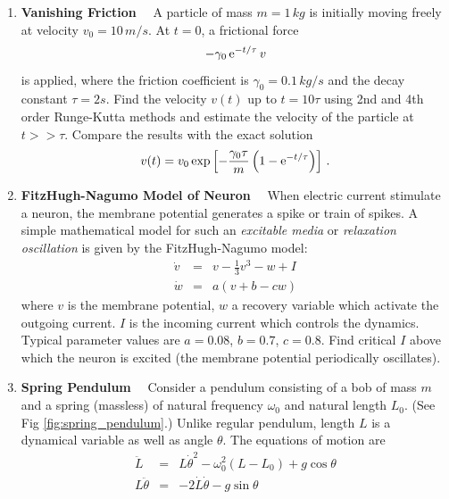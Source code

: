 \begin{enumerate}[labelwidth=0.5cm,labelindent=0cm,leftmargin=*,label=\bfseries \thechapter.\arabic*,align=left]
\item \textbf{Vanishing Friction}~~
A particle of mass $m=1\, kg$ is initially moving freely at velocity $v_0=10\, m/s$.  At $t=0$, a frictional force
\begin{equation}
-\gamma_0\, \text{e}^{-t/\tau}\, v
\end{equation}
is applied, where the friction coefficient is $\gamma_0=0.1\, kg/s$ and the decay constant $\tau = 2s$. Find the velocity $v(t)$ up to $t=10\tau$ using 2nd and 4th order Runge-Kutta methods and estimate the velocity of the particle at $t>>\tau$. Compare the results with the exact solution 
\begin{equation}
v(t) = v_0 \exp \left [ - \frac{\gamma_0 \tau}{m} \left (1-\text{e}^{-t/\tau} \right ) \right ]\, .
\end{equation}


\item  \textbf{FitzHugh-Nagumo Model of Neuron}~~
When electric current stimulate a neuron, the membrane potential generates a spike or train of spikes. A simple mathematical model for such an \emph{excitable media} or \emph{relaxation oscillation} is given by the FitzHugh-Nagumo model\cite{FitzHugh-Nagumo}:
\begin{subequations}
\begin{eqnarray}
\dot{v} &=& v - \frac{1}{3}v^3 - w + I \\
\dot{w} &=& a (v + b - c w)
\end{eqnarray}
\end{subequations}
where $v$ is the membrane potential, $w$ a recovery variable which activate the outgoing current. $I$ is the incoming current which controls the dynamics. Typical parameter values are $a=0.08$, $b=0.7$, $c=0.8$.  Find critical $I$ above which the neuron is excited (the membrane potential periodically oscillates).

\item \textbf{Spring Pendulum}~~
Consider a pendulum consisting of a bob of mass $m$ and a spring (massless) of natural frequency $\omega_0$ and natural length $L_0$.\cite{spring_pendulum}
(See Fig \ref{fig:spring_pendulum}.)  Unlike regular pendulum, length $L$ is a dynamical variable as well as angle $\theta$.  The equations of motion are
\begin{subequations}
\begin{eqnarray}
\ddot{L} &=& L \dot{\theta}^2 - \omega_0^2 (L-L_0) + g \cos\theta \\
L \ddot{\theta} &=& - 2 \dot{L} \dot{\theta} - g \sin\theta
\end{eqnarray}
\end{subequations}


\end{enumerate}
